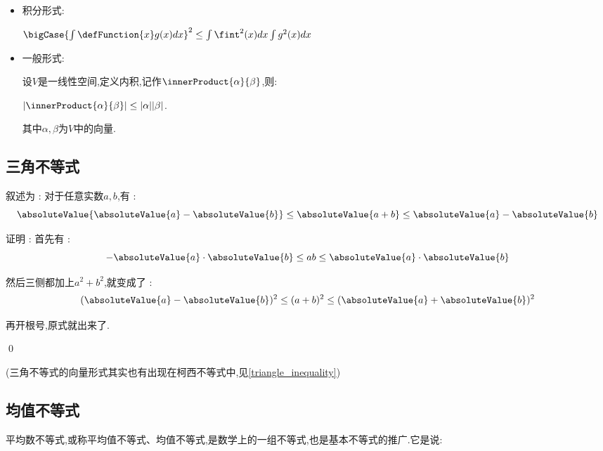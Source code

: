 {{{\begin{itemize}
{              在三角形$ABC$中,这个式子可以写作:$||\vec{AB}|| + ||\vec{BC}|| \geq ||\vec{AC}|| = \doubleAbsoluteValue{\doubleAbsoluteValue{\vec{AB}} + \doubleAbsoluteValue{\vec{BC}}}$

              也就是说:$\sqrt{a^2 + b^2} + \sqrt{c^2 + d^2} \geq \sqrt{(a - c)^2 + (b - d)^2}$

              等号成立的条件为:$ad = bc \land ac + bc \geq 0$(即$\cfrac{a}{c} = \cfrac{b}{d}$).

              }
        \item {
              积分形式:

              $\bigCase{\int\defFunction{x}g(x)dx}^2 \leq \int\fint^2(x)dx \int g^2(x)dx$
              }
        \item {
              一般形式:

              设$V$是一线性空间,定义内积,记作$\innerProduct{\alpha}{\beta}$,则:

              $|\innerProduct{\alpha}{\beta}| \leq |\alpha||\beta|$.

              其中$\alpha,\beta$为$V$中的向量.
              }
    \end{itemize}
}\label{triangle_inequality}%

\subsection{三角不等式}{
    叙述为 : 对于任意实数$a,b$,有 :
    $$
        \absoluteValue{\absoluteValue{a} - \absoluteValue{b}} \leq \absoluteValue{a + b} \leq \absoluteValue{a} - \absoluteValue{b}
    $$

    证明 : 首先有 : $$
        -\absoluteValue{a}\cdot\absoluteValue{b} \leq ab \leq \absoluteValue{a}\cdot\absoluteValue{b}
    $$

    然后三侧都加上$a^2 + b^2$,就变成了 : $$
        (\absoluteValue{a} - \absoluteValue{b})^2 \leq (a + b)^2 \leq (\absoluteValue{a} + \absoluteValue{b})^2
    $$

    再开根号,原式就出来了.

    \qed

    (三角不等式的向量形式其实也有出现在柯西不等式中,见{\ref{triangle_inequality}})
}

\subsection{均值不等式}{
平均数不等式,或称平均值不等式、均值不等式,是数学上的一组不等式,也是基本不等式的推广.它是说:

}}}

